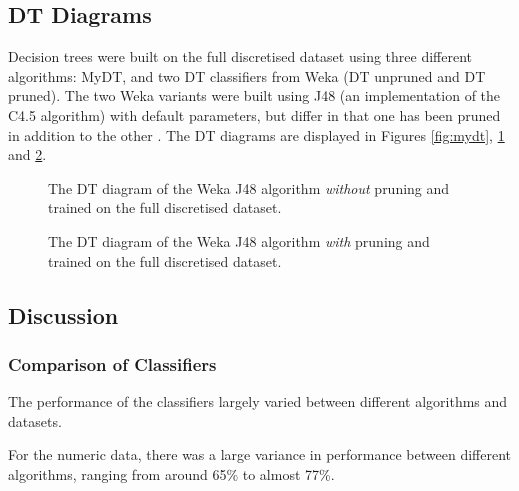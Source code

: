 \subsection{DT Diagrams}
Decision trees were built on the full discretised dataset using three different algorithms: MyDT, and two DT classifiers from Weka (DT unpruned and DT pruned). The two Weka variants were built using J48 (an implementation of the C4.5 algorithm) with default parameters, but differ in that one has been pruned in addition to the other \cite{weka}. The DT diagrams are displayed in Figures \ref{fig:mydt}, \ref{fig:dt_unprune} and \ref{fig:dt_prune}.


\begin{figure}[h!]
    \begin{obeylines}
        
    \end{obeylines}
    \caption{The DT diagram of the Weka J48 algorithm \textit{without} pruning and trained on the full discretised dataset.\label{fig:dt_unprune}}
\end{figure}

\begin{figure}[h!]
    \begin{obeylines}
        
    \end{obeylines}
    \caption{The DT diagram of the Weka J48 algorithm \textit{with} pruning and trained on the full discretised dataset.\label{fig:dt_prune}}
\end{figure}


\subsection{Discussion}

\subsubsection{Comparison of Classifiers}


The performance of the classifiers largely varied between different algorithms and datasets. 

For the numeric data, there was a large variance in performance between different algorithms, ranging from around 65\% to almost 77\%. 

